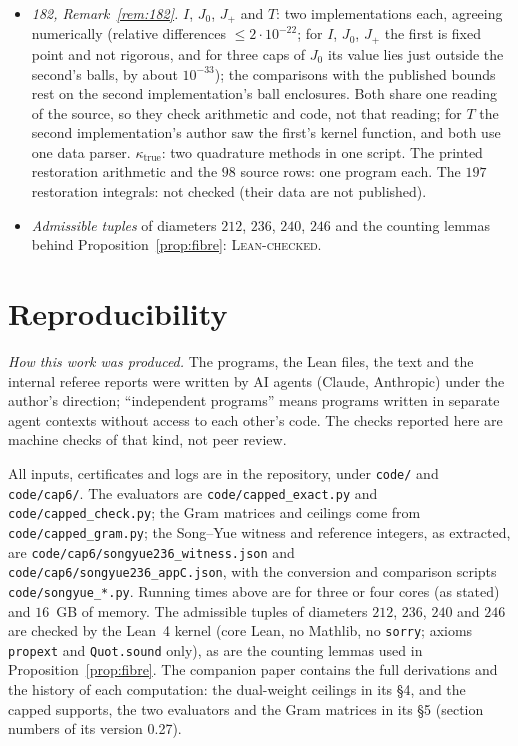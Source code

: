 \documentclass[11pt]{amsart}
\theoremstyle{definition}
\theoremstyle{remark}
\newcommand{\lbl}[1]{\textup{\textsc{#1}}}
\begin{document}
\begin{itemize}
  only.
\item \emph{182, Remark~\ref{rem:182}.} $I$, $J_0$, $J_+$ and $T$: two
  implementations each, agreeing numerically (relative differences
  $\le2\cdot10^{-22}$; for $I$, $J_0$, $J_+$ the first is fixed point and not rigorous, and for three
  caps of $J_0$ its value lies just outside the second's balls, by about
  $10^{-33}$); the comparisons with the published bounds rest on the second
  implementation's ball enclosures. Both share one reading of the source, so
  they check arithmetic and code, not that reading; for $T$ the second
  implementation's author saw the first's kernel function, and both use one
  data parser. $\kappa_{\mathrm{true}}$: two
  quadrature methods in one script. The printed restoration arithmetic and the
  $98$ source rows: one program each. The $197$ restoration integrals: not
  checked (their data are not published).
\item \emph{Admissible tuples} of diameters $212$, $236$, $240$, $246$ and the
  counting lemmas behind Proposition~\ref{prop:fibre}: \lbl{Lean-checked}.
\end{itemize}

\section{Reproducibility}
\emph{How this work was produced.} The programs, the Lean files, the text and
the internal referee reports were written by AI agents (Claude, Anthropic)
under the author's direction; ``independent programs'' means programs written
in separate agent contexts without access to each other's code. The checks
reported here are machine checks of that kind, not peer review.

All inputs, certificates and logs are in the repository, under
\texttt{code/} and \texttt{code/cap6/}. The evaluators are
\texttt{code/capped\_exact.py} and \texttt{code/capped\_check.py}; the Gram
matrices and ceilings come from \texttt{code/capped\_gram.py}; the Song--Yue
witness and reference integers, as extracted, are
\texttt{code/cap6/songyue236\_witness.json} and
\texttt{code/cap6/songyue236\_appC.json}, with the conversion and comparison
scripts \texttt{code/songyue\_*.py}. Running times above are for three or four cores (as stated)
and $16$~GB of memory. The admissible tuples of diameters $212$, $236$, $240$
and $246$ are checked by the Lean~4 kernel (core Lean, no Mathlib, no
\texttt{sorry}; axioms \texttt{propext} and \texttt{Quot.sound} only), as are
the counting lemmas used in Proposition~\ref{prop:fibre}. The companion paper
\cite{Kim26} contains the full derivations and the history of each
computation: the dual-weight ceilings in its \S4, and the capped supports,
the two evaluators and the Gram matrices in its \S5 (section numbers of its
version 0.27).
\end{document}
